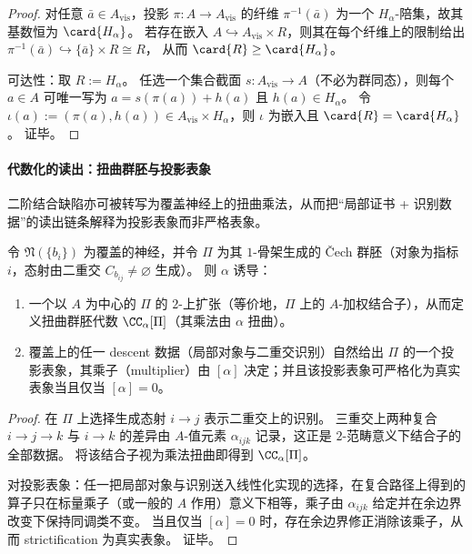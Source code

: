 \begin{proof}
对任意 \(\bar a\in A_{\mathrm{vis}}\)，投影 \(\pi:A\to A_{\mathrm{vis}}\) 的纤维 \(\pi^{-1}(\bar a)\) 为一个 \(H_\alpha\)-陪集，故其基数恒为 \(\card{H_\alpha}\)。
若存在嵌入 \(A\hookrightarrow A_{\mathrm{vis}}\times R\)，则其在每个纤维上的限制给出
\(
\pi^{-1}(\bar a)\hookrightarrow \{\bar a\}\times R\cong R
\)，
从而 \(\card{R}\ge \card{H_\alpha}\)。
\par
可达性：取 \(R:=H_\alpha\)。
任选一个集合截面 \(s:A_{\mathrm{vis}}\to A\)（不必为群同态），则每个 \(a\in A\) 可唯一写为 \(a=s(\pi(a))+h(a)\) 且 \(h(a)\in H_\alpha\)。
令 \(\iota(a):=(\pi(a),h(a))\in A_{\mathrm{vis}}\times H_\alpha\)，则 \(\iota\) 为嵌入且 \(\card{R}=\card{H_\alpha}\)。
证毕。
\end{proof}

\paragraph{代数化的读出：扭曲群胚与投影表象}
二阶结合缺陷亦可被转写为覆盖神经上的扭曲乘法，从而把“局部证书 + 识别数据”的读出链条解释为投影表象而非严格表象。

\begin{proposition}\label{prop:prefix-site-projective-rep-twist}
令 \(\mathfrak N(\{b_i\})\) 为覆盖的神经，并令 \(\Pi\) 为其 \(1\)-骨架生成的 Čech 群胚（对象为指标 \(i\)，态射由二重交 \(C_{b_{ij}}\neq\varnothing\) 生成）。
则 \(\alpha\) 诱导：
\begin{enumerate}
  \item 一个以 \(A\) 为中心的 \(\Pi\) 的 \(2\)-上扩张（等价地，\(\Pi\) 上的 \(A\)-加权结合子），从而定义扭曲群胚代数 \(\CC_\alpha[\Pi]\)（其乘法由 \(\alpha\) 扭曲）。
  \item 覆盖上的任一 descent 数据（局部对象与二重交识别）自然给出 \(\Pi\) 的一个投影表象，其乘子（multiplier）由 \([\alpha]\) 决定；并且该投影表象可严格化为真实表象当且仅当 \([\alpha]=0\)。
\end{enumerate}
\end{proposition}

\begin{proof}
在 \(\Pi\) 上选择生成态射 \(i\to j\) 表示二重交上的识别。
三重交上两种复合 \(i\to j\to k\) 与 \(i\to k\) 的差异由 \(A\)-值元素 \(\alpha_{ijk}\) 记录，这正是 \(2\)-范畴意义下结合子的全部数据。
将该结合子视为乘法扭曲即得到 \(\CC_\alpha[\Pi]\)。
\par
对投影表象：任一把局部对象与识别送入线性化实现的选择，在复合路径上得到的算子只在标量乘子（或一般的 \(A\) 作用）意义下相等，乘子由 \(\alpha_{ijk}\) 给定并在余边界改变下保持同调类不变。
当且仅当 \([\alpha]=0\) 时，存在余边界修正消除该乘子，从而 strictification 为真实表象。
证毕。
\end{proof}

